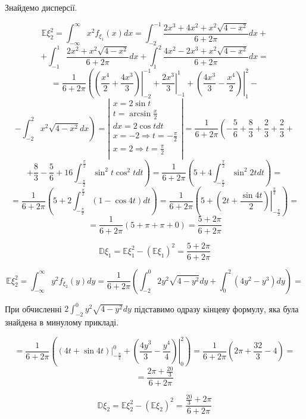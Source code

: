 \documentclass[14pt, a4paper, ukrainian]{extreport}
\begin{document}
	Знайдемо дисперсії.
	
	$$ \mathbb{E}\xi_2^2 = \int_{-\infty}^{\infty}x^2f_{\xi_1}(x)dx = \int_{-2}^{-1}\frac{2x^3 + 4x^2 + x^2\sqrt{4-x^2}}{6+2\pi}dx +
	$$
	$$ + \int_{-1}^{1}\frac{2x^2 + x^2\sqrt{4-x^2}}{6+2\pi}dx + \int_{1}^{2}\frac{4x^2-2x^3 + x^2\sqrt{4-x^2}}{6+2\pi}dx =
	$$
	$$ = \frac{1}{6+2\pi}\left(\left.\left(\frac{x^4}{2} + \frac{4x^3}{3} \right)\right|_{-2}^{-1} + \left.{\frac{2x^3}{3}}\right|_{-1}^{1} + \left.\left(\frac{4x^3}{3} - \frac{x^4}{2}\right)\right|_{1}^{2} - \right.$$
	$$ - \left.\int_{-2}^{2}x^2\sqrt{4-x^2}dx\right) = \left|
	\begin{matrix}
		x = 2\sin{t}\\
		t = \arcsin{\frac{x}{2}}\\
		dx = 2\cos{t}dt\\
		x = -2 \Rightarrow t = -\frac{\pi}{2}\\
		x = 2 \Rightarrow t = \frac{\pi}{2}\\
	\end{matrix}
	\right| = 
	\frac{1}{6+2\pi} \left(-\frac{5}{6} + \frac{8}{3} + \frac{2}{3} + \frac{2}{3} + \right.
	$$ 
	$$ + \frac{8}{3} - \frac{5}{6} + \left.16\int_{-\frac{\pi}{2}}^{\frac{\pi}{2}}\sin^2{t}\cos^2{t}dt \right) = \frac{1}{6+2\pi}\left(5 + 4 \int_{-\frac{\pi}{2}}^{\frac{\pi}{2}}\sin^2{2t}dt\right) =
	$$
	$$ = \frac{1}{6+2\pi}\left(5 + 2\int_{-\frac{\pi}{2}}^{\frac{\pi}{2}}(1 - \cos{4t})dt\right)
	 = \frac{1}{6+2\pi}\left(5 + \left.\left(2t + \frac{\sin{4t}}{2}\right)\right|_{-\frac{\pi}{2}}^{\frac{\pi}{2}}\right) =
	$$
	$$ = \frac{1}{6+2\pi}\left(5 + \pi + \pi + 0 \right) =
	 \frac{5 + 2\pi}{6+2\pi}
	$$
	
	$$\mathbb{D}\xi_1 = \mathbb{E}\xi_1^2 - (\mathbb{E}\xi_1)^2 =\frac{5 + 2\pi}{6+2\pi} 
	$$	
	
	$$\mathbb{E}\xi_2^2 = \int_{-\infty}^{\infty}y^2f_{\xi_2}(y)dy = \frac{1}{6+2\pi}\left(\int_{-2}^{0}2y^2\sqrt{4-y^2}dy + \int_{0}^{2}(4y^2-y^3)dy\right) =$$
	
	При обчисленні $2\int_{-2}^{0}y^2\sqrt{4-y^2}dy$ підставимо одразу кінцеву формулу, яка була знайдена в минулому прикладі.
	
	$$ = \frac{1}{6 + 2\pi}\left(\left.\left(4t + \sin{4t}\right)\right|_{-\frac{\pi}{2}}^{0} + \left.\left(\frac{4y^3}{3} - \frac{y^4}{4}\right)\right|_0^2 \right) = 
	\frac{1}{6 + 2\pi}\left(2\pi + \frac{32}{3} - 4 \right) = 
	$$
	$$ = \frac{2\pi + \frac{20}{3} }{6 + 2\pi}$$
	
	$$\mathbb{D}\xi_2 = \mathbb{E}\xi_2^2 - (\mathbb{E}\xi_2)^2 = \frac{\frac{20}{3} + 2\pi}{6+2\pi}
	$$	
	
\end{document}
